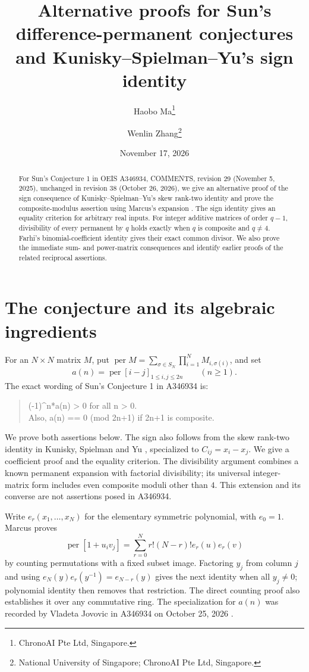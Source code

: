 \documentclass[11pt]{article}
\title{Alternative proofs for Sun's difference-permanent conjectures\protect\\
and Kunisky--Spielman--Yu's sign identity}
\author{Haobo Ma\thanks{ChronoAI Pte Ltd, Singapore.}\and
Wenlin Zhang\thanks{National University of Singapore; ChronoAI Pte Ltd, Singapore.}}
\date{November 17, 2026}
\newcommand{\per}{\operatorname{per}}
\begin{document}
\maketitle
\begin{abstract}
For Sun's Conjecture 1 in OEIS A346934, COMMENTS, revision 29
(November 5, 2025), unchanged in revision 38 (October 26, 2026),
we give an alternative proof of the sign consequence of
Kunisky--Spielman--Yu's skew rank-two identity
\cite[Section 5, pp.~24--25; August 28, 2026]{ksy} and prove the
composite-modulus assertion using Marcus's expansion
\cite[Lemma 4; August 5, 2021]{marcus}.
The sign identity gives an equality criterion for arbitrary real inputs.
For integer additive matrices of order $q-1$, divisibility of every
permanent by $q$ holds exactly when $q$ is composite and $q\ne4$.
Farhi's binomial-coefficient identity gives their exact common divisor.
We also prove the immediate sum- and power-matrix consequences and
identify earlier proofs of the related reciprocal assertions.
\end{abstract}

\section{The conjecture and its algebraic ingredients}
For an $N\times N$ matrix $M$, put
$\per M=\sum_{\sigma\in S_N}\prod_{i=1}^N M_{i,\sigma(i)}$, and set
\[
 a(n)=\per[i-j]_{1\le i,j\le 2n}\qquad(n\ge1).
\]
The exact wording of Sun's Conjecture 1 in A346934 \cite{oeis} is:
\begin{quote}\ttfamily\raggedright
(-1)\^{}n*a(n) > 0 for all n > 0.\\
Also, a(n) == 0 (mod 2n+1) if 2n+1 is composite.
\end{quote}
We prove both assertions below. The sign also follows from the
skew rank-two identity in Kunisky, Spielman and Yu \cite[pp.~24--25]{ksy},
specialized to $C_{ij}=x_i-x_j$. We give a coefficient proof and the
equality criterion. The divisibility argument combines a known
permanent expansion with factorial divisibility; its universal
integer-matrix form includes even composite moduli other than $4$.
This extension and its converse are not assertions posed in A346934.

Write $e_r(x_1,\ldots,x_N)$ for the elementary symmetric polynomial,
with $e_0=1$. Marcus \cite[Lemma 4, pp.~5--6]{marcus} proves
\[
 \per[1+u_iv_j]=\sum_{r=0}^N r!(N-r)!e_r(u)e_r(v)
\]
by counting permutations with a fixed subset image.
Factoring $y_j$ from column $j$ and using
$e_N(y)e_r(y^{-1})=e_{N-r}(y)$ gives the next identity when all
$y_j\ne0$; polynomial identity then removes that restriction.
The direct counting proof also establishes it over any commutative ring.
The specialization for $a(n)$ was recorded by Vladeta Jovovic in
A346934 on October 25, 2026 \cite[FORMULA]{oeis}.
\end{document}
